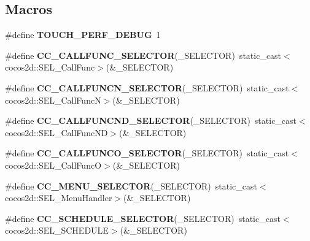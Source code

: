 \subsection*{Macros}
\begin{DoxyCompactItemize}
\item 
\mbox{\label{group__base_gaabe4e43a30c4e67a327af2e2557274f9}} 
\#define {\bfseries T\+O\+U\+C\+H\+\_\+\+P\+E\+R\+F\+\_\+\+D\+E\+B\+UG}~1
\item 
\mbox{\label{group__base_ga93a3458e1b6e06e251b8ba774eeb7ad1}} 
\#define {\bfseries C\+C\+\_\+\+C\+A\+L\+L\+F\+U\+N\+C\+\_\+\+S\+E\+L\+E\+C\+T\+OR}(\+\_\+\+S\+E\+L\+E\+C\+T\+OR)~static\+\_\+cast$<$cocos2d\+::\+S\+E\+L\+\_\+\+Call\+Func$>$(\&\+\_\+\+S\+E\+L\+E\+C\+T\+OR)
\item 
\mbox{\label{group__base_ga0304dbc1f312ce25d4969490c869d09d}} 
\#define {\bfseries C\+C\+\_\+\+C\+A\+L\+L\+F\+U\+N\+C\+N\+\_\+\+S\+E\+L\+E\+C\+T\+OR}(\+\_\+\+S\+E\+L\+E\+C\+T\+OR)~static\+\_\+cast$<$cocos2d\+::\+S\+E\+L\+\_\+\+Call\+FuncN$>$(\&\+\_\+\+S\+E\+L\+E\+C\+T\+OR)
\item 
\mbox{\label{group__base_ga03e93bdcfd4468f47fc770c8e4bc6dd5}} 
\#define {\bfseries C\+C\+\_\+\+C\+A\+L\+L\+F\+U\+N\+C\+N\+D\+\_\+\+S\+E\+L\+E\+C\+T\+OR}(\+\_\+\+S\+E\+L\+E\+C\+T\+OR)~static\+\_\+cast$<$cocos2d\+::\+S\+E\+L\+\_\+\+Call\+Func\+ND$>$(\&\+\_\+\+S\+E\+L\+E\+C\+T\+OR)
\item 
\mbox{\label{group__base_gacc358701e9f3c5b6629930a999f97eb8}} 
\#define {\bfseries C\+C\+\_\+\+C\+A\+L\+L\+F\+U\+N\+C\+O\+\_\+\+S\+E\+L\+E\+C\+T\+OR}(\+\_\+\+S\+E\+L\+E\+C\+T\+OR)~static\+\_\+cast$<$cocos2d\+::\+S\+E\+L\+\_\+\+Call\+FuncO$>$(\&\+\_\+\+S\+E\+L\+E\+C\+T\+OR)
\item 
\mbox{\label{group__base_gaf2d69346f4d31ab77732198a9ebe0f22}} 
\#define {\bfseries C\+C\+\_\+\+M\+E\+N\+U\+\_\+\+S\+E\+L\+E\+C\+T\+OR}(\+\_\+\+S\+E\+L\+E\+C\+T\+OR)~static\+\_\+cast$<$cocos2d\+::\+S\+E\+L\+\_\+\+Menu\+Handler$>$(\&\+\_\+\+S\+E\+L\+E\+C\+T\+OR)
\item 
\mbox{\label{group__base_ga364ba06f4b51d54fe45605b4cde10302}} 
\#define {\bfseries C\+C\+\_\+\+S\+C\+H\+E\+D\+U\+L\+E\+\_\+\+S\+E\+L\+E\+C\+T\+OR}(\+\_\+\+S\+E\+L\+E\+C\+T\+OR)~static\+\_\+cast$<$cocos2d\+::\+S\+E\+L\+\_\+\+S\+C\+H\+E\+D\+U\+LE$>$(\&\+\_\+\+S\+E\+L\+E\+C\+T\+OR)

\end{DoxyCompactItemize}
